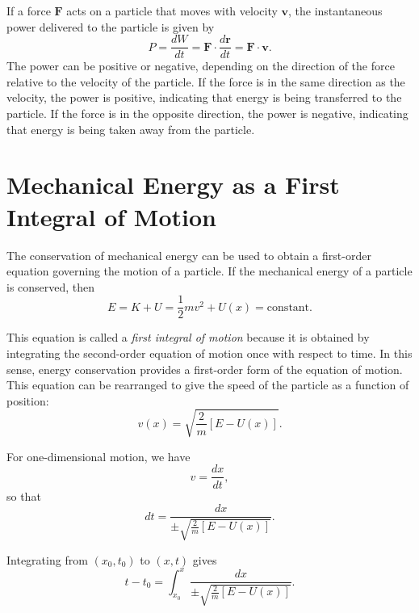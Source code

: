 \documentclass[12pt]{article}
\begin{document}
If a force $\mathbf{F}$ acts on a particle that moves with velocity $\mathbf{v}$, the instantaneous power delivered to the particle is given by
\begin{equation}
P = \frac{dW}{dt} = \mathbf{F} \cdot \frac{d\mathbf{r}}{dt} = \mathbf{F}\cdot\mathbf{v}.
\end{equation}
 The power can be positive or negative, depending on the direction of the force relative to the velocity of the particle. If the force is in the same direction as the velocity, the power is positive, indicating that energy is being transferred to the particle. If the force is in the opposite direction, the power is negative, indicating that energy is being taken away from the particle.


\section{Mechanical Energy as a First Integral of Motion}

The conservation of mechanical energy can be used to obtain a first-order equation governing the motion of a particle. If the mechanical energy of a particle is conserved, then
\begin{equation}
E = K + U
  = \frac{1}{2} m v^2 + U(x)
  = \text{constant}.
\end{equation}

This equation is called a \emph{first integral of motion} because it is obtained by integrating the second-order equation of motion once with respect to time. In this sense, energy conservation provides a first-order form of the equation of motion. This equation can be rearranged to give the speed of the particle as a function of position:
\begin{equation}
v(x)
=
\sqrt{\frac{2}{m}\left[E-U(x)\right]}.
\end{equation}

For one-dimensional motion, we have
\begin{equation}
v = \frac{dx}{dt},
\end{equation}
so that
\begin{equation}
dt
=
\frac{dx}{\pm\sqrt{\frac{2}{m}\left[E-U(x)\right]}}.
\end{equation}

Integrating from $(x_0,t_0)$ to $(x,t)$ gives
\begin{equation}
t-t_0
=
\int_{x_0}^{x}
\frac{dx}
{\pm\sqrt{\frac{2}{m}\left[E-U(x)\right]}}.
\end{equation}
\end{document}
